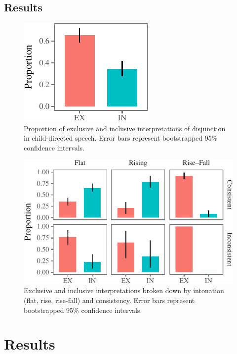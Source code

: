 \documentclass[oneside]{report}
\theoremstyle{definition}
\theoremstyle{definition}
\theoremstyle{definition}
\theoremstyle{remark}
\begin{document}
\subsection{Results}\label{results-4}
\begin{figure}[b]

{\centering \includegraphics{figs/interpretation-1} 

}

\caption{Proportion of exclusive and inclusive interpretations of disjunction in child-directed speech. Error bars represent bootstrapped 95\% confidence intervals.}\label{fig:interpretation}
\end{figure}
\begin{figure}[t]

{\centering \includegraphics{figs/interpretationByIntonationAndConsistency-1} 

}

\caption{Exclusive and inclusive interpretations broken down by intonation (flat, rise, rise-fall) and consistency. Error bars represent bootstrapped 95\% confidence intervals.}\label{fig:interpretationByIntonationAndConsistency}
\end{figure}
\section{Results}\label{results-5}
\end{document}

